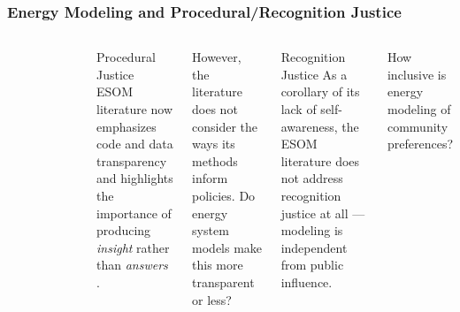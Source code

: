 \begin{frame}
    \frametitle{Energy Modeling and Procedural/Recognition Justice}
    \begin{columns}
        \column[t]{3cm}
        \begin{figure}
            \centering
        \end{figure}
        \column[t]{7cm}
        \begin{block}{Procedural Justice}
            ESOM literature now emphasizes code and data transparency
            \cite{decarolis_formalizing_2017} and highlights the importance of
            producing \textit{insight} rather than \textit{answers}
            \cite{decarolis_using_2011}.
        \end{block}
        \pause
        \begin{block}{}
            However, the literature does not consider the ways its methods
            inform policies. Do energy system models make this more transparent or less?
        \end{block}
        \pause
        \begin{block}{Recognition Justice}
            As a corollary of its lack of self-awareness, the ESOM literature
            does not address recognition justice at all --- modeling is
            independent from public influence.
        \end{block}
        \begin{block}{}
            How inclusive is energy modeling of community preferences?
        \end{block}
    \end{columns}
    
\end{frame}

